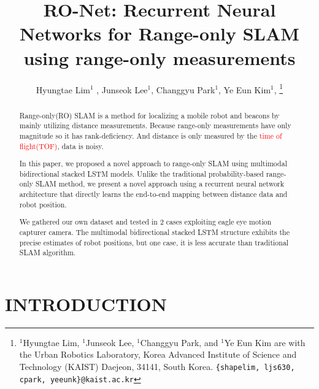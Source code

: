 \documentclass[letterpaper, 10 pt, conference]{ieeeconf}  %
\title{\LARGE \bf
RO-Net: Recurrent Neural Networks for Range-only SLAM using range-only measurements}
\author{Hyungtae Lim$^{1}$ , Junseok Lee$^{1}$, Changgyu Park$^{1}$, Ye Eun Kim$^{1}$, %
\thanks{$^{1}$Hyungtae Lim, $^{1}$Junseok Lee, $^{1}$Changgyu Park, and $^{1}$Ye Eun Kim are with
	the Urban Robotics Laboratory, Korea Advanced Institute of Science
	and Technology (KAIST) Daejeon, 34141, South Korea. {\tt\small \{shapelim, ljs630, cpark, yeeunk\}@kaist.ac.kr}}%
%
}
\begin{document}


\maketitle
\thispagestyle{empty}
\pagestyle{empty}


\begin{abstract}

Range-only(RO) SLAM is a method for localizing a mobile robot and beacons by mainly utilizing distance measurements. Because range-only measurements have only magnitude so it has rank-deficiency. And distance is only measured by the \textcolor{red}{time of flight(TOF)}, data is noisy.

In this paper, we proposed a novel approach to range-only SLAM using multimodal bidirectional stacked LSTM models. Unlike the traditional probability-based range-only SLAM method, we present a novel approach using a recurrent neural network architecture that directly learns the end-to-end mapping between distance data and robot position.

We gathered our own dataset and tested in 2 cases exploiting eagle eye motion capturer camera. The multimodal bidirectional stacked LSTM structure exhibits the precise estimates of robot positions, but one case, it is less accurate than traditional SLAM algorithm. 


\end{abstract}


\section{INTRODUCTION}
\end{document}
